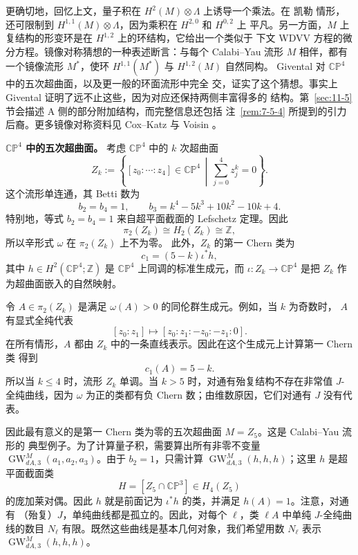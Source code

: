 更确切地，回忆上文，量子积在 $H^2(M)\otimes\Lambda$ 上诱导一个乘法。在 凯勒
情形，还可限制到 $H^{1,1}(M)\otimes\Lambda$，因为乘积在 $H^{2,0}$ 和 $H^{0,2}$ 上
平凡。另一方面，$M$ 上复结构的形变环是在 $H^{1,2}$ 上的环结构，它给出一个类似于
下文 WDVV 方程的微分方程。镜像对称猜想的一种表述断言：与每个 Calabi--Yau 流形 $M$
相伴，都有一个镜像流形 $M^*$，使环 $H^{1,1}(M^*)$ 与 $H^{1,2}(M)$ 自然同构。
Givental  对 $\mathbb{CP}^4$ 中的五次超曲面，以及更一般的环面流形中完全
交，证实了这个猜想。事实上 Givental 证明了远不止这些，因为对应还保持两侧丰富得多的
结构。第~\ref{sec:11-5} 节会描述 A 侧的部分附加结构，而完整信息还包括
注~\ref{rem:7-5-4} 所提到的引力后裔。更多镜像对称资料见 Cox--Katz  与
Voisin 。

\medskip
\noindent\textbf{$\mathbb{CP}^4$ 中的五次超曲面。}
考虑 $\mathbb{CP}^4$ 中的 $k$ 次超曲面
\[
  Z_k:=\left\{[z_0:\cdots:z_4]\in\mathbb{CP}^4\,\middle|\,
  \sum_{j=0}^4z_j^k=0\right\}.
\]
这个流形单连通，其 Betti 数为
\[
  b_2=b_4=1,
  \qquad
  b_3=k^4-5k^3+10k^2-10k+4.
\]
特别地，等式 $b_2=b_4=1$ 来自超平面截面的 Lefschetz 定理。因此
\[
  \pi_2(Z_k)\cong H_2(Z_k)\cong\mathbb Z,
\]
所以辛形式 $\omega$ 在 $\pi_2(Z_k)$ 上不为零。
此外，$Z_k$ 的第一 Chern 类为
\[
  c_1=(5-k)\iota^*h,
\]
其中 $h\in H^2(\mathbb{CP}^4;\mathbb Z)$ 是 $\mathbb{CP}^4$ 上同调的标准生成元，而
$\iota:Z_k\to\mathbb{CP}^4$ 是把 $Z_k$ 作为超曲面嵌入的自然映射。

令 $A\in\pi_2(Z_k)$ 是满足 $\omega(A)>0$ 的同伦群生成元。例如，当 $k$ 为奇数时，
$A$ 有显式全纯代表
\[
  [z_0:z_1]\longmapsto[z_0:z_1:-z_0:-z_1:0].
\]
在所有情形，$A$ 都由 $Z_k$ 中的一条直线表示。因此在这个生成元上计算第一 Chern 类
得到
\[
  c_1(A)=5-k.
\]
所以当 $k\leq4$ 时，流形 $Z_k$ 单调。当 $k>5$ 时，对通有殆复结构不存在非常值
$J$-全纯曲线，因为 $\omega$ 为正的类都有负 Chern 数；由维数原因，它们对通有 $J$
没有代表。

因此最有意义的是第一 Chern 类为零的五次超曲面 $M=Z_5$。这是 Calabi--Yau 流形的
典型例子。为了计算量子积，需要算出所有非零不变量
$\operatorname{GW}_{dA,3}^M(a_1,a_2,a_3)$。由于 $b_2=1$，只需计算
$\operatorname{GW}_{dA,3}^M(h,h,h)$；这里 $h$ 是超平面截面类
\[
  H=[Z_5\cap\mathbb{CP}^3]\in H_4(Z_5)
\]
的庞加莱对偶。因此 $h$ 就是前面记为 $\iota^*h$ 的类，并满足 $h(A)=1$。注意，对通有
（殆复）$J$，单纯曲线都是孤立的。因此，对每个 $\ell$，类 $\ell A$ 中单纯
$J$-全纯曲线的数目 $N_\ell$ 有限。既然这些曲线是基本几何对象，我们希望用数 $N_\ell$
表示 $\operatorname{GW}_{dA,3}^M(h,h,h)$。

